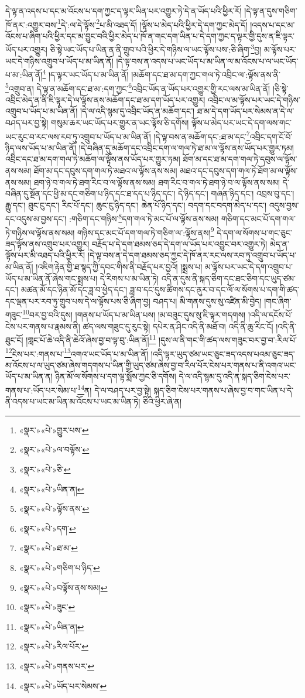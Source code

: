 དེ་ལྟ་ན་འདས་པ་དང་མ་འོངས་པ་དག་ཀྱང་ད་ལྟར་ཡིན་པར་འགྱུར་ཏེ་དེ་ན་ཡོད་པའི་ཕྱིར་རོ། །དེ་ལྟ་ན་དུས་གཅིག་ཁོ་ནར་:འགྱུར་བས་\footnote{«སྣར་»«པེ་»གྱུར་པས་}དེ་:ལ་དེ་ལྟོས་\footnote{«སྣར་»«པེ་»ལ་བལྟོས་}པ་མི་འཐད་དོ། །ལྟོས་པ་མེད་པའི་ཕྱིར་དེ་དག་ཀྱང་མེད་དོ། །འདས་པ་དང་མ་འོངས་པ་ཞིག་པའི་ཕྱིར་དང་མ་བྱུང་བའི་ཕྱིར་མེད་པ་ཁོ་ན་གང་དག་ཡིན་པ་དེ་དག་ཀྱང་ད་ལྟར་གྱི་དུས་ན་ཇི་ལྟར་ཡོད་པར་འགྱུར། ཅི་སྟེ་ཡང་ཡོད་པ་ཡིན་ན་ནི་གྲུབ་པའི་ཕྱིར་དེ་གཉིས་ལ་ཡང་ལྟོས་པས་:ཅི་ཞིག་\footnote{«སྣར་»«པེ་»ཅི་}བྱ། མ་ལྟོས་པར་ཡང་དེ་གཉིས་འགྲུབ་པ་ཡོད་པ་མ་ཡིན་ནོ། །དེ་ལྟ་བས་ན་འདས་པ་ཡང་ཡོད་པ་མ་ཡིན་ལ་མ་འོངས་པ་ལ་ཡང་ཡོད་པ་མ་:ཡིན་ནོ།\footnote{«སྣར་»«པེ་»ཡིན་ན།} །ད་ལྟར་ཡང་ཡོད་པ་མ་ཡིན་ནོ། །མཆོག་དང་ཐ་མ་དག་ཀྱང་གལ་ཏེ་འབྲིང་ལ་:ལྟོས་ནས་ནི་\footnote{«སྣར་»«པེ་»ལྟོས་ནས་}འགྲུབ་ན། དེ་ལྟ་ན་མཆོག་དང་ཐ་མ་:དག་ཀྱང་\footnote{«སྣར་»«པེ་»དག་}འབྲིང་ཡོད་ན་ཡོད་པར་འགྱུར་གྱི་རང་ལས་མ་ཡིན་ནོ། །ཅི་སྟེ་འབྲིང་མེད་ན་ནི་ཇི་ལྟར་དེ་ལ་ལྟོས་ནས་མཆོག་དང་ཐ་མ་དག་ཡོད་པར་འགྱུར། འབྲིང་ལ་མ་ལྟོས་པར་ཡང་དེ་གཉིས་འགྲུབ་པ་ཡོད་པ་མ་ཡིན་ནོ། །དེ་ལ་འདི་སྙམ་དུ་འབྲིང་ཡོད་ན་མཆོག་དང་། ཐ་མ་དེ་དག་ཡོད་པར་སེམས་ན་དེ་ལ་བཤད་པར་བྱ་སྟེ། གསུམ་ཆར་ཡང་ཡོད་པར་གྱུར་ན་ཡང་ལྟོས་ཅི་དགོས། ལྟོས་པ་མེད་པར་ཡང་དེ་དག་ལས་གང་ཡང་རུང་བ་རང་ལས་རབ་ཏུ་འགྲུབ་པ་ཡོད་པ་མ་ཡིན་ནོ། །དེ་ལྟ་བས་ན་མཆོག་དང་:ཐ་མ་དང་\footnote{«སྣར་»«པེ་»ཐ་མ་}འབྲིང་དག་ངོ་བོ་ཉིད་ལས་ཡོད་པ་མ་ཡིན་ནོ། །དེ་བཞིན་དུ་མཆོག་དང་འབྲིང་དག་ལ་གལ་ཏེ་ཐ་མ་ལ་ལྟོས་ནས་ཡོད་པར་གྱུར་ཏམ། འབྲིང་དང་ཐ་མ་དག་གལ་ཏེ་མཆོག་ལ་ལྟོས་ནས་ཡོད་པར་གྱུར་ཏམ། ཐོག་མ་དང་ཐ་མ་དག་གལ་ཏེ་དབུས་ལ་ལྟོས་ནས་སམ། ཐོག་མ་དང་དབུས་དག་གལ་ཏེ་མཐའ་ལ་ལྟོས་ནས་སམ། མཐའ་དང་དབུས་དག་གལ་ཏེ་ཐོག་མ་ལ་ལྟོས་ནས་སམ། ཐག་ཉེ་བ་གལ་ཏེ་ཐག་རིང་བ་ལ་ལྟོས་ནས་སམ། ཐག་རིང་བ་གལ་ཏེ་ཐག་ཉེ་བ་ལ་ལྟོས་ནས་སམ། དེ་བཞིན་དུ་སྔོན་དང་ཕྱི་མ་དང་གཅིག་པ་ཉིད་དང་ཐ་དད་པ་ཉིད་དང་། དེ་ཉིད་དང་། གཞན་ཉིད་དང་། འབྲས་བུ་དང་། རྒྱུ་དང་། ཐུང་ངུ་དང་། རིང་པོ་དང་། ཆུང་ངུ་ཉིད་དང་། ཆེན་པོ་ཉིད་དང་། བདག་དང་བདག་མེད་པ་དང་། འདུས་བྱས་དང་འདུས་མ་བྱས་དང་། :གཅིག་དང་གཉིས་\footnote{«སྣར་»«པེ་»གཅིག་པ་ཉིད་}དག་གལ་ཏེ་མང་པོ་ལ་ལྟོས་ནས་སམ། གཅིག་དང་མང་པོ་དག་གལ་ཏེ་གཉིས་ལ་ལྟོས་ནས་སམ། གཉིས་དང་མང་པོ་དག་གལ་ཏེ་གཅིག་ལ་:ལྟོས་ནས།\footnote{«སྣར་»«པེ་»བལྟོས་ནས་སམ།} དེ་དག་ལ་སོགས་པ་གང་ཅུང་ཟད་ལྟོས་ནས་འགྲུབ་པར་འགྱུར། བརྗོད་པ་དེ་དག་ཐམས་ཅད་དེ་དག་ལ་ཡོད་པར་འབྱུང་བར་འགྱུར་ཏེ། མེད་ན་ལྟོས་པར་མི་འཐད་པའི་ཕྱིར་རོ། །དེ་ལྟ་བས་ན་དེ་དག་ཐམས་ཅད་ཀྱང་དེ་ཁོ་ནར་རང་ལས་རབ་ཏུ་འགྲུབ་པ་ཡོད་པ་མ་ཡིན་ནོ། །འཇིག་རྟེན་གྱི་ཐ་སྙད་ཀྱི་དབང་གིས་ནི་བརྗོད་པར་བྱའོ། །སྨྲས་པ། མ་ལྟོས་པར་ཡང་དེ་དག་འགྲུབ་པ་ཡོད་པ་མ་ཡིན་ནོ་ཞེས་གང་སྨྲས་པ། དེ་རིགས་པ་མ་ཡིན་ཏེ། འདི་ན་དུས་ནི་སྐད་ཅིག་དང་ཐང་ཅིག་དང་ཡུད་ཙམ་དང་། མཚན་མོ་དང་ཉིན་མོ་དང་ཟླ་བ་ཕྱེད་དང་། ཟླ་བ་དང་དུས་ཚིགས་དང་ནུར་བ་དང་ལོ་ལ་སོགས་པ་དག་གི་ཚད་དང་ལྡན་པར་རབ་ཏུ་གྲུབ་པས་དེ་ལ་ལྟོས་པས་ཅི་ཞིག་བྱ། བཤད་པ། མི་གནས་དུས་སུ་འཛིན་མི་བྱེད། །གང་ཞིག་གཟུང་\footnote{«སྣར་»«པེ་»ཟུང་}བར་བྱ་བའི་དུས། །གནས་པ་ཡོད་པ་མ་ཡིན་པས། །མ་བཟུང་དུས་སུ་ཇི་ལྟར་གདགས། །འདི་ལ་དངོས་པོ་ངེས་པར་གནས་པ་རྣམས་ནི། ཚད་ལས་གཟུང་དུ་རུང་སྟེ། དཔེར་ན་ཤིང་འདི་ནི་མཐོ་བ། འདི་ནི་ཆུ་རིང་ངོ། །འདི་ནི་ཐུང་ངོ། །གླང་པོ་ཆེ་འདི་ནི་ཆེའོ་ཞེས་བྱ་བ་ལྟ་བུ་:ཡིན་ནོ།\footnote{«སྣར་»«པེ་»ཡིན་ན།} །དུས་ལ་ནི་གང་གི་ཚད་ལས་གཟུང་བར་བྱ་བ་:རིལ་པོ་\footnote{«སྣར་»«པེ་»རིལ་པོར་}ངེས་པར་:གནས་པ་\footnote{«སྣར་»«པེ་»གནས་པར་}འགའ་ཡང་ཡོད་པ་མ་ཡིན་ནོ། །འདི་ལྟར་ཡུད་ཙམ་ཡང་ཅུང་ཟད་འདས་པའམ་ཅུང་ཟད་མ་འོངས་པ་ལ་ཡུད་ཙམ་ཞེས་གདགས་པ་ཡིན་གྱི་ཡུད་ཙམ་ཞེས་བྱ་བ་རིལ་པོར་ངེས་པར་གནས་པ་ནི་འགའ་ཡང་ཡོད་པ་མ་ཡིན་ན། ཉིན་མོ་ལ་སོགས་པ་དག་ལྟ་སྨོས་ཀྱང་ཅི་དགོས། དེ་ལ་འདི་སྙམ་དུ་འདི་ན་སྐད་ཅིག་ངེས་པར་གནས་པ་:ཡོད་པར་སེམ་པ་\footnote{«སྣར་»«པེ་»ཡོད་པར་སེམས་}ན། དེ་ལ་བཤད་པར་བྱ་སྟེ། སྐད་ཅིག་ངེས་པར་གནས་པ་ཞེས་བྱ་བ་གང་ཡིན་པ་དེ་ནི་འདས་པ་ཡང་མ་ཡིན་མ་འོངས་པ་ཡང་མ་ཡིན་ཏེ། ཅིའི་ཕྱིར་ཞེ་ན། 